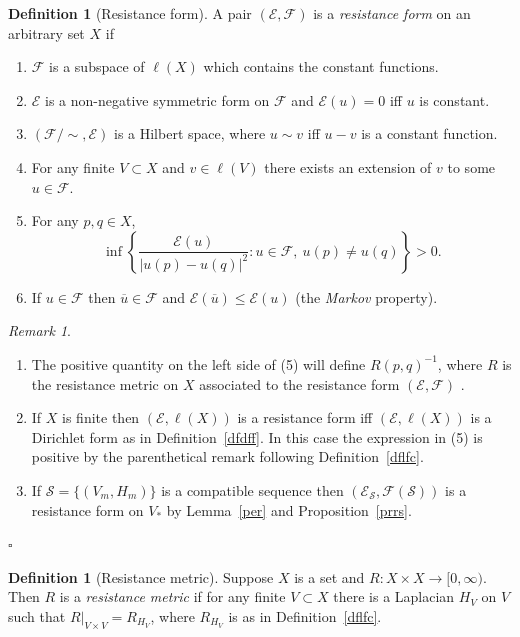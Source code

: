 \documentclass[a4paper]{amsart}
\theoremstyle{plain}
\theoremstyle{definition}
\newtheorem{definition}[theorem]{Definition}%
\theoremstyle{remark}
\newtheorem{remark}[theorem]{Remark}
\begin{document}
\begin{definition}[Resistance form] \label{dfrf} A pair $ ( \mathcal{E} , \mathcal{F} ) $ is a \emph{resistance form} on an arbitrary set $ X $ if 
\begin{enumerate}
\item $ \mathcal{F} $ is a subspace of $ \ell(X) $ which contains the constant functions.
\item $ \mathcal{E} $ is a non-negative symmetric form on $ \mathcal{F} $ and $ \mathcal{E} (u) = 0 $ iff $ u $ is constant.
\item $ ( \mathcal{F} /\!\!\sim, \mathcal{E} ) $ is a Hilbert space, where $ u \sim v $ iff $ u-v $ is a constant function.
\item For any   finite $ V \subset X $ and $ v \in \ell(V) $ there exists an extension of $ v $ to some $ u \in \mathcal{F} $.
\item For any $ p,q \in X $,
\[
 \inf \left\{ \frac{ \mathcal{E}   (u) } { |u(p) - u(q)|^2 } : u \in \mathcal{F} ,\ u(p) \neq u(q) \right\} > 0.
 \]
 \item If $ u \in \mathcal{F}  $ then $ \overline{u} \in \mathcal{F}  $ and $ \mathcal{E}  (\overline{u}) \leq \mathcal{E}  (u)$  (the \emph{Markov} property).
\end{enumerate} 
\end{definition}


\begin{remark}
\mbox{}
\begin{enumerate}
\item The positive quantity on the left side of (5) will define $ R(p,q)^{-1}$,  where $ R   $ is the resistance metric on $ X $ associated to the resistance form $   ( \mathcal{E} , \mathcal{F} ) $ .
\item If $ X $ is finite then $ ( \mathcal{E} , \ell(X) ) $ is a resistance form iff $ ( \mathcal{E} , \ell(X) ) $ is a Dirichlet form as in Definition~\ref{dfdff}.  In this case the expression in (5) is positive by the parenthetical remark following Definition~\ref{dflfc}.
\item If  $ \mathcal{S} = \{(V_m,H_m)\} $ is a compatible sequence then     $ (\mathcal{E} _ { \mathcal{S}}  , \mathcal{F} ( \mathcal{S} ) )$ is a resistance form on $ V_* $ by Lemma~\ref{per} and Proposition~\ref{prrs}.
\end{enumerate}
\hfill $\square$  \end{remark} 


\begin{definition}[Resistance metric]  Suppose $ X $ is a set and $ R: X \times X \to [0,\infty) $. Then $ R $ is a \emph{resistance metric} if for any finite $ V \subset X $ there is a Laplacian $ H_V $ on $ V $ such that $ R|_{V\times V} = R_{H_V} $, where $ R_{H_V} $ is as in Definition~\ref{dflfc}.
\end{definition} 
\end{document}
